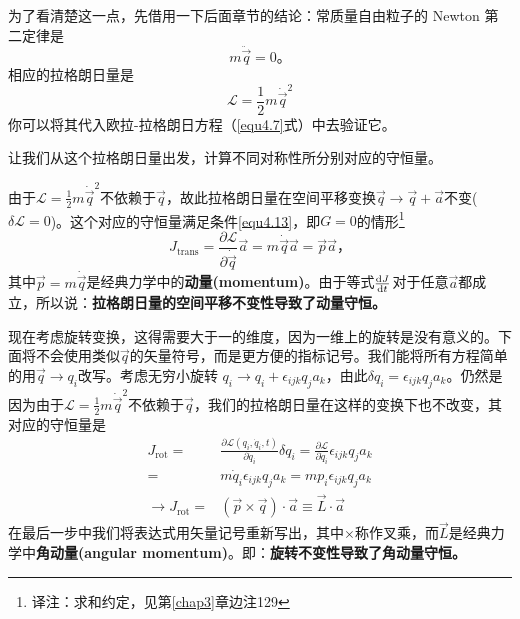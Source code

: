 为了看清楚这一点，先借用一下后面章节的结论：常质量自由粒子的 Newton 第二定律是%
\begin{equation}
m{\ddot\vec{q}} = 0 \text{。}
\end{equation}
相应的拉格朗日量是%
\begin{equation}
{\mathcal L}=\frac{1}{2}m\dot\vec{q}^2
\end{equation}
你可以将其代入欧拉-拉格朗日方程（\ref{equ4.7}式）中去验证它。

让我们从这个拉格朗日量出发，计算不同对称性所分别对应的守恒量。

由于${\mathcal L}=\frac{1}{2}m{\dot\vec q}^2$不依赖于$\vec q$，故此拉格朗日量在空间平移变换$\vec{q}\rightarrow\vec{q}+\vec{a}$不变($\delta{\mathcal L}=0$)。这个对应的守恒量满足条件\ref{equ4.13}，即$G=0$的情形\footnote{译注：求和约定，见第\ref{chap3}章边注129}
\begin{equation}
J_\text{trans} = \frac{\partial\mathcal L}{\partial \dot\vec q} \vec a = m {\dot\vec q} {\vec a} = \vec{p}\vec{a} \text{，}
\end{equation}
其中$\vec{p}=m{\dot\vec q}$是经典力学中的{\bf 动量(momentum)}。由于等式$\frac{\mathrm d J}{\mathrm d t}$对于任意$\vec a$都成立，所以说：{\bf 拉格朗日量的空间平移不变性导致了动量守恒。}

现在考虑旋转变换，这得需要大于一的维度，因为一维上的旋转是没有意义的。下面将不会使用类似$\vec q$的矢量符号，而是更方便的指标记号。我们能将所有方程简单的用$\vec{q}\rightarrow q_i$改写。考虑无穷小旋转%
%
$q_i \rightarrow q_i + \epsilon_{ijk} q_j a_k$，由此$\delta q_i=\epsilon_{ijk}q_j a_k$。仍然是因为由于${\mathcal L}=\frac{1}{2}m{\dot\vec q}^2$不依赖于$\vec q$，我们的拉格朗日量在这样的变换下也不改变，其对应的守恒量是%
\begin{equation}
\begin{aligned}
J_\text{rot} =& \frac{\partial {\mathcal L}(q_i, \dot q_i, t)}{\partial \dot q_i}\delta q_i  = \frac{\partial \mathcal L}{\partial \dot q_i} \epsilon_{ijk} q_j a_k \\
  =& m {\dot q_i} \epsilon_{ijk} q_j a_k = m p_i\epsilon_{ijk} q_j a_k \\
  \rightarrow J_\text{rot} =& (\vec{p}\times\vec{q})\cdot\vec{a} \equiv \vec{L}\cdot\vec{a}
\end{aligned}
\end{equation}
在最后一步中我们将表达式用矢量记号重新写出，其中$\times$称作叉乘，而$\vec L$是经典力学中{\bf 角动量(angular momentum)}。即：{\bf 旋转不变性导致了角动量守恒。}

